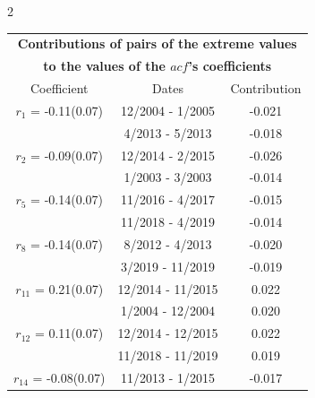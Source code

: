 
\thispagestyle{empty}
\begin{multicols}{2}{ 
\begin{tabular}{ccc}
\multicolumn{3}{c}{\textbf{Contributions of pairs of the extreme values} }  \vspace{-.10in}  \\ 
\multicolumn{3}{c}{ \textbf{to the values of the $acf$'s coefficients}} \\ 
\hline 
\hline                  Coefficient  &  Dates &  Contribution \\ 
\hline 
  $r_{ 1}$ = -0.11(0.07) &      12/2004 -  1/2005 &       -0.021    \vspace{-.10in} \\ 
  &        4/2013 -  5/2013 &       -0.018  \vspace{-.02in}   \\ \hline 
    $r_{ 2}$ = -0.09(0.07) &      12/2014 -  2/2015 &       -0.026    \vspace{-.10in} \\ 
  &        1/2003 -  3/2003 &       -0.014  \vspace{-.02in}   \\ \hline 
    $r_{ 5}$ = -0.14(0.07) &      11/2016 -  4/2017 &       -0.015    \vspace{-.10in} \\ 
  &       11/2018 -  4/2019 &       -0.014  \vspace{-.02in}   \\ \hline 
    $r_{ 8}$ = -0.14(0.07) &       8/2012 -  4/2013 &       -0.020    \vspace{-.10in} \\ 
  &        3/2019 - 11/2019 &       -0.019  \vspace{-.02in}   \\ \hline 
    $r_{11}$ = 0.21(0.07) &      12/2014 - 11/2015 &        0.022   \vspace{-.10in} \\  
&        1/2004 - 12/2004 &        0.020  \vspace{-.02in} \\ \hline 
  $r_{12}$ = 0.11(0.07) &      12/2014 - 12/2015 &        0.022   \vspace{-.10in} \\  
&       11/2018 - 11/2019 &        0.019  \vspace{-.02in} \\ \hline 
  $r_{14}$ = -0.08(0.07) &      11/2013 -  1/2015 &       -0.017    \vspace{-.10in} \\ 

\end{tabular}}
\end{multicols}
